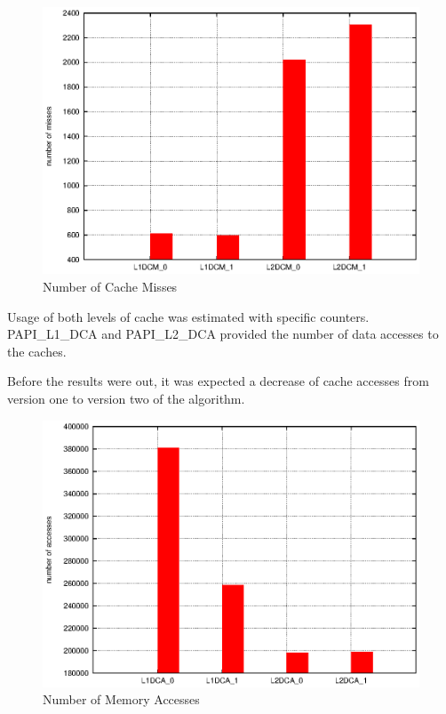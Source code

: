 \documentclass[a4paper,10pt,openright,openbib]{article}
\begin{document}
\begin{figure}[!htp]
	\centering
	\begin{minipage}[t]{0.5\linewidth}
		\includegraphics[width=\textwidth]{images/misses.eps}
		\caption{Number of Cache Misses \label{fig:cachel1}}
	\end{minipage}
\end{figure} 

Usage of both levels of cache was estimated with specific counters. PAPI\_L1\_DCA and PAPI\_L2\_DCA provided the number of data accesses to the caches.

Before the results were out, it was expected a decrease of cache accesses from version one to version two of the algorithm.

\begin{figure}[!htp]
	\centering
	\begin{minipage}[t]{0.5\linewidth}
		\includegraphics[width=\textwidth]{images/totals.eps}
		\caption{Number of Memory Accesses \label{fig:cachel1}}
	\end{minipage}
\end{figure}
\end{document}
